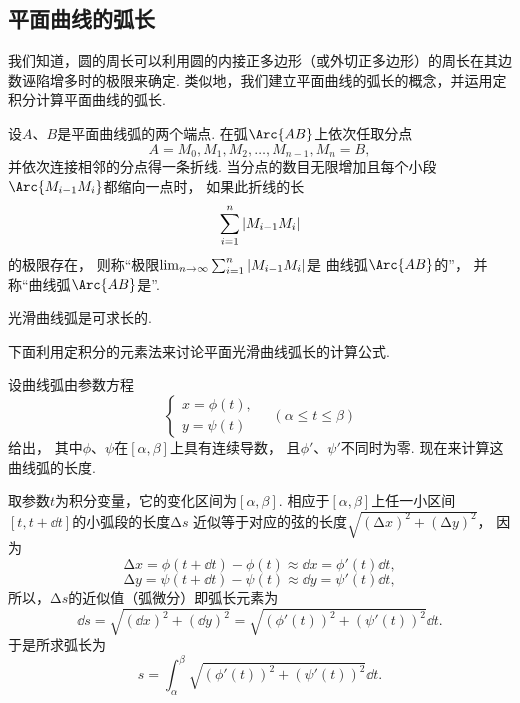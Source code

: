 \subsection{平面曲线的弧长}
我们知道，圆的周长可以利用圆的内接正多边形（或外切正多边形）的周长在其边数诬陷增多时的极限来确定.
类似地，我们建立平面曲线的弧长的概念，并运用定积分计算平面曲线的弧长.

设\(A\)、\(B\)是平面曲线弧的两个端点.
在弧\(\Arc{AB}\)上依次任取分点\begin{equation*}
	A=M_0,M_1,M_2,\dotsc,M_{n-1},M_n=B,
\end{equation*}并依次连接相邻的分点得一条折线.
当分点的数目无限增加且每个小段\(\Arc{M_{i-1}M_i}\)都缩向一点时，
如果此折线的长\begin{equation*}
	\sum_{i=1}^n \abs{M_{i-1} M_i}
\end{equation*}的极限存在，
则称“极限\(\lim_{n\to\infty} \sum_{i=1}^n \abs{M_{i-1} M_i}\)是
曲线弧\(\Arc{AB}\)的”，
并称“曲线弧\(\Arc{AB}\)是”.

\begin{theorem}
光滑曲线弧是可求长的.
\end{theorem}

下面利用定积分的元素法来讨论平面光滑曲线弧长的计算公式.

设曲线弧由参数方程\begin{equation*}
	\left\{ \begin{array}{l}
	x = \phi(t), \\
	y = \psi(t)
	\end{array} \right.
	\quad(\alpha \leq t \leq \beta)
\end{equation*}给出，
其中\(\phi\)、\(\psi\)在\([\alpha,\beta]\)上具有连续导数，
且\(\phi'\)、\(\psi'\)不同时为零.
现在来计算这曲线弧的长度.

取参数\(t\)为积分变量，它的变化区间为\([\alpha,\beta]\).
相应于\([\alpha,\beta]\)上任一小区间\([t,t+\dd{t}]\)的小弧段的长度\(\increment s\)
近似等于对应的弦的长度\(\sqrt{(\increment x)^2+(\increment y)^2}\)，
因为\begin{equation*}
	\increment x
	= \phi(t+\dd{t})-\phi(t)
	\approx \dd{x}
	= \phi'(t) \dd{t},
\end{equation*}\begin{equation*}
	\increment y
	= \psi(t+\dd{t})-\psi(t)
	\approx \dd{y}
	= \psi'(t) \dd{t},
\end{equation*}
所以，\(\increment s\)的近似值（弧微分）即弧长元素为\begin{equation*}
	\dd{s} = \sqrt{(\dd{x})^2 + (\dd{y})^2}
	= \sqrt{(\phi'(t))^2 + (\psi'(t))^2} \dd{t}.
\end{equation*}
于是所求弧长为\begin{equation}
	s = \int_\alpha^\beta \sqrt{(\phi'(t))^2 + (\psi'(t))^2} \dd{t}.
\end{equation}


